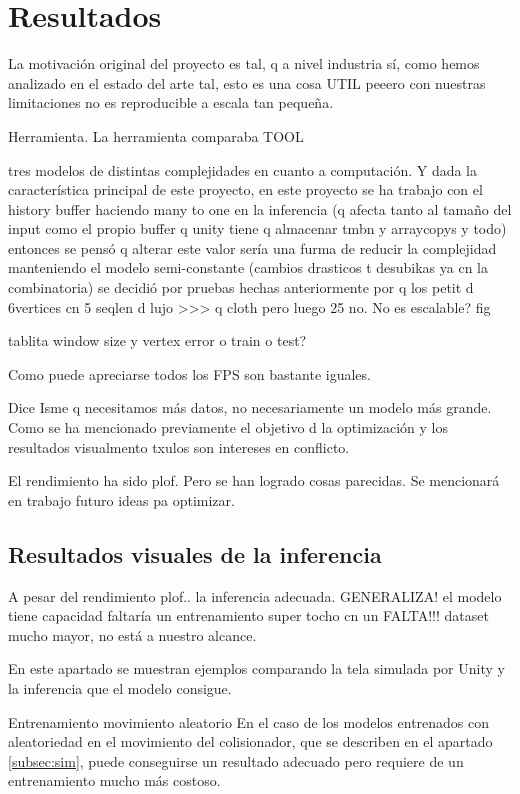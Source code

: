 \section{Resultados}
\label{sec:ModelosFuncionales}


La motivación original del proyecto es tal, q a nivel industria sí, como hemos analizado en el estado del arte tal, esto es una cosa UTIL peeero con nuestras limitaciones no es reproducible a escala tan pequeña.

Herramienta. La herramienta comparaba TOOL

tres modelos de distintas complejidades en cuanto a computación. Y dada la característica principal de este proyecto, en este proyecto se ha trabajo con el history buffer haciendo many to one en la inferencia (q afecta tanto al tamaño del input como el propio buffer q unity tiene q almacenar tmbn y arraycopys y todo) entonces se pensó q alterar este valor sería una furma de reducir la complejidad manteniendo el modelo semi-constante (cambios drasticos t desubikas ya cn la combinatoria) se decidió por pruebas hechas anteriormente por q los petit d 6vertices cn 5 seqlen d lujo >>> q cloth pero luego 25 no. No es escalable? 
fig

tablita window size y vertex error o train o test?

Como puede apreciarse todos los FPS son bastante iguales. 

Dice Isme q necesitamos más datos, no necesariamente un modelo más grande. Como se ha mencionado previamente el objetivo d la optimización y los resultados visualmento txulos son intereses en conflicto. 

El rendimiento ha sido plof. Pero se han logrado cosas parecidas. Se mencionará en trabajo futuro ideas pa optimizar.


\subsection{Resultados visuales de la inferencia}
A pesar del rendimiento plof.. la inferencia adecuada. GENERALIZA! el modelo tiene capacidad faltaría un entrenamiento super tocho cn un FALTA!!! dataset mucho mayor, no está a nuestro alcance. 

En este apartado se muestran ejemplos comparando la tela simulada por Unity y la inferencia que el modelo consigue. \newline

Entrenamiento movimiento aleatorio
En el caso de los modelos entrenados con aleatoriedad en el movimiento del colisionador, que se describen en el apartado \ref{subsec:sim}, puede conseguirse un resultado adecuado pero requiere de un entrenamiento mucho más costoso. 

